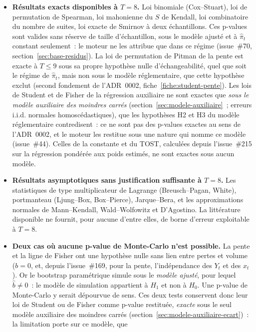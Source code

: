 \documentclass[a4paper,11pt]{article}
\begin{document}
\begin{itemize}[itemsep=3pt]
  \item \textbf{Résultats exacts disponibles à $T = 8$.} Loi binomiale
  (Cox--Stuart), loi de permutation de Spearman, loi mahonienne du $S$ de
  Kendall, loi combinatoire du nombre de suites, loi exacte de Smirnov à deux
  échantillons. Ces p-values sont valides sans réserve de taille d'échantillon, sous le
  modèle ajusté et à $\hat\pi_t$ constant seulement~: le moteur ne les attribue que dans ce
  régime (issue~\#70, section~\ref{sec:base-residus}). La loi de permutation de
  Pitman de la pente est exacte à $T \le 9$ sous sa propre hypothèse nulle
  d'échangeabilité, quel que soit le régime de $\hat\pi_t$, mais non sous le modèle
  réglementaire, que cette hypothèse exclut (second fondement de l'ADR~0002,
  fiche~\ref{fiche:student-pente}). Les
  lois de Student et de Fisher de la régression auxiliaire ne sont exactes que
  \emph{sous le modèle auxiliaire des moindres carrés} (section~\ref{sec:modele-auxiliaire}~; erreurs i.i.d. normales
  homoscédastiques), que les hypothèses H2 et H3 du modèle réglementaire
  contredisent~: ce ne sont pas des p-values exactes au sens de l'ADR~0002, et le
  moteur les restitue sous une nature qui nomme ce modèle (issue~\#44). Celles de la
  constante et du TOST, calculées depuis l'issue~\#215 sur la régression pondérée aux
  poids estimés, ne sont exactes sous aucun modèle.
  \item \textbf{Résultats asymptotiques sans justification suffisante à
  $T = 8$.} Les statistiques de type multiplicateur de Lagrange
  (Breusch--Pagan, White), portmanteau (Ljung--Box, Box--Pierce),
  Jarque--Bera, et les approximations normales de Mann--Kendall,
  Wald--Wolfowitz et D'Agostino. La littérature disponible ne fournit, pour
  aucune d'entre elles, de borne d'erreur exploitable à $T = 8$.
  \item \textbf{Deux cas où aucune p-value de Monte-Carlo n'est possible.} La
  pente et la ligne de Fisher ont une hypothèse nulle sans lien entre pertes et
  volume ($b = 0$, et, depuis l'issue~\#169, pour la pente, l'indépendance des
  $Y_t$ et des $x_t$). Or le bootstrap paramétrique simule sous le \emph{modèle
  ajusté}, pour lequel $\hat b \neq 0$~: le modèle de simulation appartient à $H_1$ et
  non à $H_0$. Une p-value de Monte-Carlo y serait dépourvue de sens. Ces deux
  tests conservent donc leur loi de Student ou de Fisher comme p-value restituée,
  \emph{exacte} sous le seul modèle auxiliaire des moindres carrés
  (section~\ref{sec:modele-auxiliaire-ecart})~: la limitation porte sur ce modèle, que

\end{itemize}
\end{document}
